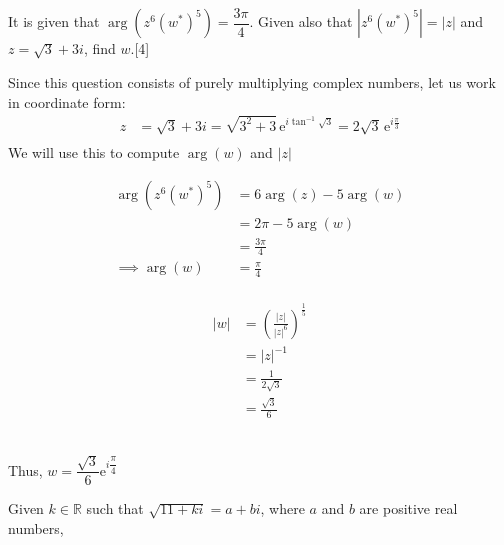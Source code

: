 \documentclass[12pt, a4 paper]{article}
\begin{document}
\begin{outline}[enumerate]
	\1 It is given that $\arg{(z^6(w^*)^5)}=\dfrac{3\pi}{4}$. Given also that $|z^6(w^*)^5|=|z|$ and $z=\sqrt{3}+3i$, find $w$.\hfill[4] %
	\begin{answer}
		Since this question consists of purely multiplying complex numbers, let us work in coordinate form:
		\begin{align*}
			z & =\sqrt{3}+3i=\sqrt{3^2+3}\,\mathrm{e}^{i\tan^{-1}{\sqrt{3}}} = 2\sqrt{3}\,\mathrm{e}^{i\frac{\pi}{3}} \\
		\end{align*}
		We will use this to compute $\arg(w)$ and $|z|$ \\
		\noindent
		\begin{minipage}{.3\textwidth}
			\begin{align*}
				\arg{(z^6(w^*)^5)} & = 6\arg(z) - 5\arg(w) \\ 
				                   & = 2\pi - 5\arg(w)     \\
				                   & = \frac{3\pi}{4}      \\
				\implies \arg(w)   & = \frac{\pi}{4}       \\
			\end{align*}
		\end{minipage}%
		\begin{minipage}{.5\textwidth}
			\begin{align*}
				|w| & = \left(\frac{|z|}{|z|^6}\right)^{\frac{1}{5}} \\
				    & = |z|^{-1}                                     \\
				    & = \frac{1}{2\sqrt{3}}                          \\
				    & = \frac{\sqrt{3}}{6}                           
			\end{align*}
		\end{minipage} \\
		Thus, $w = \dfrac{\sqrt{3}}{6}\mathrm{e}^{i\dfrac{\pi}{4}}$
	\end{answer}
		        
	\1 Given $k \in \mathbb{R}$ such that $\sqrt{11+ki}=a+bi$, where $a$ and $b$ are positive real numbers, %
		    

\end{outline}
\end{document}
